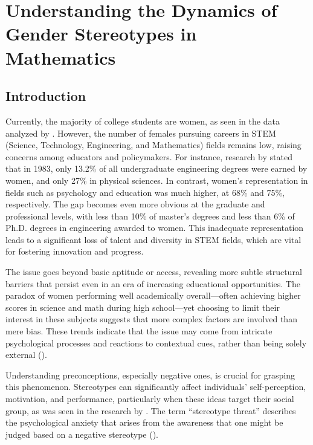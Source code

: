 \chapter{Understanding the Dynamics of Gender Stereotypes in Mathematics}\label{chap:SocialScience}
\section{Introduction}
Currently, the majority of college students are women, as seen in the data analyzed by \textcite{OWID2024}. However, the number of females pursuing careers in STEM (Science, Technology, Engineering, and Mathematics) fields remains low, raising concerns among educators and policymakers.
For instance, research by \textcite{eccles1989} stated that in 1983, only 13.2\% of all undergraduate engineering degrees were earned by women, and only 27\% in physical sciences. In contrast, women's representation in fields such as psychology and education was much higher, at 68\% and 75\%, respectively. The gap becomes even more obvious at the graduate and professional levels, with less than 10\% of master's degrees and less than 6\% of Ph.D. degrees in engineering awarded to women. This inadequate representation leads to a significant loss of talent and diversity in STEM fields, which are vital for fostering innovation and progress.

The issue goes beyond basic aptitude or access, revealing more subtle structural barriers that persist even in an era of increasing educational opportunities. The paradox of women performing well academically overall—often achieving higher scores in science and math during high school—yet choosing to limit their interest in these subjects suggests that more complex factors are involved than mere bias. These trends indicate that the issue may come from intricate psychological processes and reactions to contextual cues, rather than being solely external (\cite{Monteiro2023}).

Understanding preconceptions, especially negative ones, is crucial for grasping this phenomenon. Stereotypes can significantly affect individuals' self-perception, motivation, and performance, particularly when these ideas target their social group, as was seen in the research by \textcite{heilman2012}. The term ``stereotype threat'' describes the psychological anxiety that arises from the awareness that one might be judged based on a negative stereotype (\cite{Spencer2016}).

